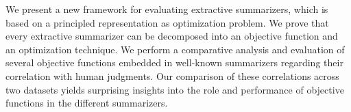 We present a new framework for evaluating extractive summarizers, which is based on a principled representation as optimization problem. We prove that every extractive summarizer can be decomposed into an objective function  and an optimization technique. We perform a comparative analysis and evaluation of several objective functions embedded in well-known summarizers regarding their correlation with human judgments. Our comparison of these correlations across two datasets yields surprising insights into the role and performance of objective functions in the different  summarizers.
